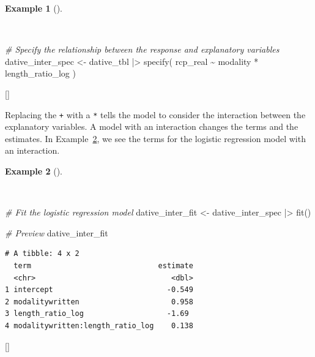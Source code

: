 \documentclass[
  letterpaper,
  krantz1]{latex/krantz-mod}
\newenvironment{Shaded}{\begin{snugshade}}{\end{snugshade}}
\newcommand{\CommentTok}[1]{\textcolor[rgb]{0.00,0.00,0.00}{\textit{#1}}}
\newcommand{\FunctionTok}[1]{\textcolor[rgb]{0.00,0.00,0.00}{#1}}
\newcommand{\NormalTok}[1]{\textcolor[rgb]{0.00,0.00,0.00}{#1}}
\newcommand{\OtherTok}[1]{\textcolor[rgb]{0.00,0.00,0.00}{#1}}
\newcommand{\SpecialCharTok}[1]{\textcolor[rgb]{0.00,0.00,0.00}{#1}}
\newcommand{\cindex}[1]{%
  \StrSubstitute{#1}{_}{\_}[\temp]%
  \index{\temp}%
}
\theoremstyle{definition}
\theoremstyle{definition}
\newtheorem{example}{Example}[chapter]
\theoremstyle{remark}
\begin{document}
\begin{example}[]\protect\hypertarget{exm-infer-cat-logistic-regression-interaction}{}\label{exm-infer-cat-logistic-regression-interaction}

~

\begin{Shaded}
\begin{Highlighting}[numbers=left,,]
\CommentTok{\# Specify the relationship between the response and explanatory variables}
\NormalTok{dative\_inter\_spec }\OtherTok{\textless{}{-}}
\NormalTok{  dative\_tbl }\SpecialCharTok{|\textgreater{}}
  \FunctionTok{specify}\NormalTok{(}
\NormalTok{    rcp\_real }\SpecialCharTok{\textasciitilde{}}\NormalTok{ modality }\SpecialCharTok{*}\NormalTok{ length\_ratio\_log}
\NormalTok{  )}
\end{Highlighting}
\end{Shaded}

 \cindex{specify()}

\end{example}

Replacing the \texttt{+} with a \texttt{*} tells the model to consider
the interaction between the explanatory variables. A model with an
interaction changes the terms and the estimates. In
Example~\ref{exm-infer-cat-logistic-regression-interaction-terms}, we
see the terms for the logistic regression model with an interaction.

\begin{example}[]\protect\hypertarget{exm-infer-cat-logistic-regression-interaction-terms}{}\label{exm-infer-cat-logistic-regression-interaction-terms}

~

\begin{Shaded}
\begin{Highlighting}[numbers=left,,]
\CommentTok{\# Fit the logistic regression model}
\NormalTok{dative\_inter\_fit }\OtherTok{\textless{}{-}}
\NormalTok{  dative\_inter\_spec }\SpecialCharTok{|\textgreater{}}
  \FunctionTok{fit}\NormalTok{()}

\CommentTok{\# Preview}
\NormalTok{dative\_inter\_fit}
\end{Highlighting}
\end{Shaded}

\begin{verbatim}
# A tibble: 4 x 2
  term                             estimate
  <chr>                               <dbl>
1 intercept                          -0.549
2 modalitywritten                     0.958
3 length_ratio_log                   -1.69 
4 modalitywritten:length_ratio_log    0.138
\end{verbatim}

 \cindex{fit()}

\end{example}
\end{document}
